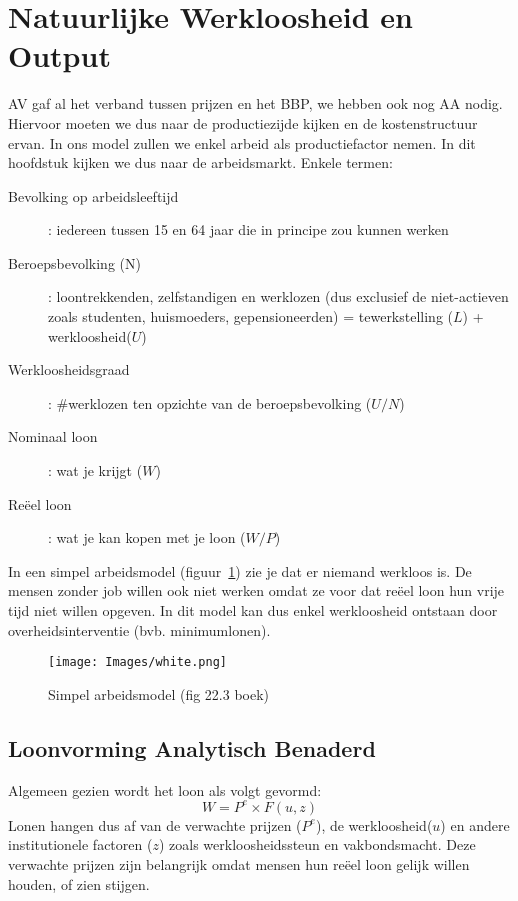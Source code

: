 \section{Natuurlijke Werkloosheid en Output}
AV gaf al het verband tussen prijzen en het BBP, we hebben ook nog AA nodig. Hiervoor moeten we dus naar de productiezijde kijken en de kostenstructuur ervan. In ons model zullen we enkel arbeid als productiefactor nemen. In dit hoofdstuk kijken we dus naar de arbeidsmarkt. Enkele termen:
\begin{description}
  \item[Bevolking op arbeidsleeftijd]: iedereen tussen 15 en 64 jaar die in principe zou kunnen werken
  \item[Beroepsbevolking (N)]: loontrekkenden, zelfstandigen en werklozen (dus exclusief de niet-actieven zoals studenten, huismoeders, gepensioneerden) = tewerkstelling ($L$) + werkloosheid($U$)
  \item[Werkloosheidsgraad]: \#werklozen ten opzichte van de beroepsbevolking ($U/N$)
  \item[Nominaal loon]: wat je krijgt ($W$)
  \item[Re\"eel loon]: wat je kan kopen met je loon ($W/P$)
\end{description}

In een simpel arbeidsmodel (figuur~\ref{fig:simpelArbeidsModel}) zie je dat er niemand werkloos is. De mensen zonder job willen ook niet werken omdat ze voor dat re\"eel loon hun vrije tijd niet willen opgeven. In dit model kan dus enkel werkloosheid ontstaan door overheidsinterventie (bvb. minimumlonen).
\begin{figure}[htbp]
	\centering
	\texttt{[image: Images/white.png]}
	\caption{Simpel arbeidsmodel (fig 22.3 boek)}
	\label{fig:simpelArbeidsModel}
\end{figure}

\subsection{Loonvorming Analytisch Benaderd}
Algemeen gezien wordt het loon als volgt gevormd:
\begin{equation}
  W = P^e \times F(u,z)
\end{equation}
Lonen hangen dus af van de verwachte prijzen ($P^e$), de werkloosheid($u$) en andere institutionele factoren ($z$) zoals werkloosheidssteun en vakbondsmacht. Deze verwachte prijzen zijn belangrijk omdat mensen hun re\"eel loon gelijk willen houden, of zien stijgen.


